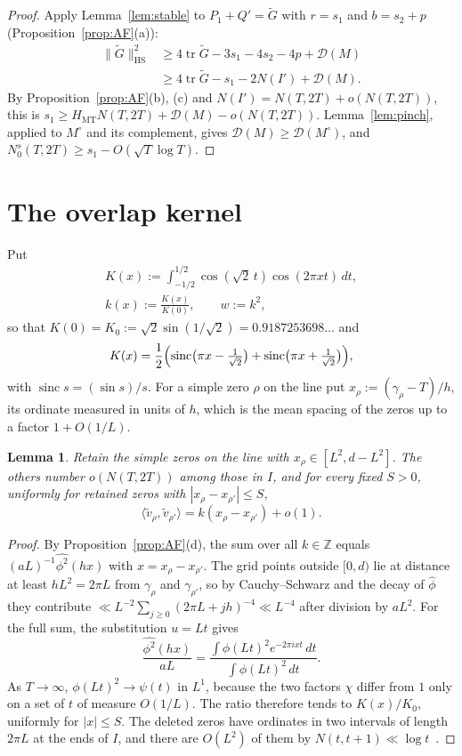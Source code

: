 \documentclass[aps,prd,twocolumn,superscriptaddress,nofootinbib,longbibliography,floatfix,showkeys,amsmath,amssymb,10pt]{revtex4-2}
\newtheorem{lemma}[theorem]{Lemma}
\theoremstyle{definition}
\theoremstyle{remark}
\newcommand{\Z}{\mathbb{Z}}
\newcommand{\cD}{\mathcal{D}}
\newcommand{\HS}{\mathrm{HS}}
\newcommand{\MT}{\mathrm{MT}}
\newcommand{\Gt}{\widetilde G}
\newcommand{\sinc}{\operatorname{sinc}}
\DeclareMathOperator{\tr}{tr}
\begin{document}
\begin{proof}
Apply Lemma~\ref{lem:stable} to $P_1+Q'=\Gt$ with $r=s_1$ and
$b=s_2+p$ (Proposition~\ref{prop:AF}(a)):
\begin{align*}
 \|\Gt\|_\HS^2&\ge4\tr\Gt-3s_1-4s_2-4p+\cD(M)\\
 &\ge4\tr\Gt-s_1-2N(I')+\cD(M).
\end{align*}
By Proposition~\ref{prop:AF}(b), (c) and $N(I')=N(T,2T)+o(N(T,2T))$, this is
$s_1\ge H_\MT N(T,2T)+\cD(M)-o(N(T,2T))$. Lemma~\ref{lem:pinch}, applied
to $M^\circ$ and its complement, gives $\cD(M)\ge\cD(M^\circ)$, and
$N_0^s(T,2T)\ge s_1-O(\sqrt T\log T)$.
\end{proof}

\section{The overlap kernel}\label{sec:kernel}

Put
\begin{gather*}
 K(x):=\int_{-1/2}^{1/2}\cos(\sqrt2\,t)\cos(2\pi xt)\,dt,\\
 k(x):=\frac{K(x)}{K(0)},\qquad w:=k^2,
\end{gather*}
so that $K(0)=K_0:=\sqrt2\sin(1/\sqrt2)=0.9187253698\ldots$ and
\begin{equation}\label{eq:Kexplicit}
 K(x)=\frac12\Bigl(\sinc\bigl(\pi x-\tfrac1{\sqrt2}\bigr)
 +\sinc\bigl(\pi x+\tfrac1{\sqrt2}\bigr)\Bigr),
\end{equation}
with $\sinc s=(\sin s)/s$. For a simple zero $\rho$ on the line put
$x_\rho:=(\gamma_\rho-T)/h$, its ordinate measured in units of $h$, which
is the mean spacing of the zeros up to a factor $1+O(1/L)$.

\begin{lemma}\label{lem:kernel}
Retain the simple zeros on the line with $x_\rho\in[L^2,d-L^2]$. The
others number $o(N(T,2T))$ among those in $I$, and for every fixed $S>0$,
uniformly for retained zeros with $|x_\rho-x_{\rho'}|\le S$,
\[
 \langle\tilde v_\rho,\tilde v_{\rho'}\rangle=k(x_\rho-x_{\rho'})+o(1).
\]
\end{lemma}

\begin{proof}
By Proposition~\ref{prop:AF}(d), the sum over all $k\in\Z$ equals
$(aL)^{-1}\widehat{\phi^2}(hx)$ with $x=x_\rho-x_{\rho'}$. The grid points
outside $[0,d)$ lie at distance at least $hL^2=2\pi L$ from $\gamma_\rho$
and $\gamma_{\rho'}$, so by Cauchy--Schwarz and the decay of
$\widehat\phi$ they contribute
$\ll L^{-2}\sum_{j\ge0}(2\pi L+jh)^{-4}\ll L^{-4}$ after division by
$aL^2$. For the full sum, the substitution $u=Lt$ gives
\[
 \frac{\widehat{\phi^2}(hx)}{aL}=
 \frac{\int\phi(Lt)^2e^{-2\pi ixt}\,dt}{\int\phi(Lt)^2\,dt}.
\]
As $T\to\infty$, $\phi(Lt)^2\to\psi(t)$ in $L^1$, because the two factors
$\chi$ differ from $1$ only on a set of $t$ of measure $O(1/L)$. The ratio
therefore tends to $K(x)/K_0$, uniformly for $|x|\le S$. The deleted zeros
have ordinates in two intervals of length $2\pi L$ at the ends of $I$, and
there are $O(L^2)$ of them by $N(t,t+1)\ll\log t$~\cite[Theorem
9.2]{Tit86}.
\end{proof}
\end{document}
